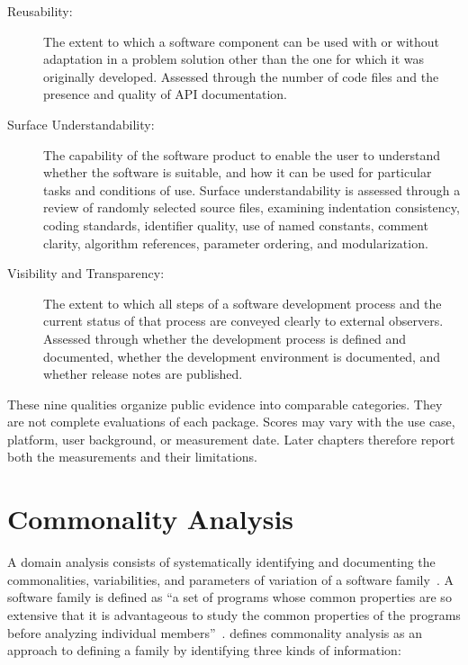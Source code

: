 \begin{description}
    \item[Reusability:] The extent to which a software component can be used with or without adaptation in a problem solution other than the one for which it was originally developed. Assessed through the number of code files and the presence and quality of API documentation.
    \item[Surface Understandability:] The capability of the software product to enable the user to understand whether the software is suitable, and how it can be used for particular tasks and conditions of use. Surface understandability is assessed through a review of randomly selected source files, examining indentation consistency, coding standards, identifier quality, use of named constants, comment clarity, algorithm references, parameter ordering, and modularization.
    \item[Visibility and Transparency:] The extent to which all steps of a software development process and the current status of that process are conveyed clearly to external observers. Assessed through whether the development process is defined and documented, whether the development environment is documented, and whether release notes are published.
\end{description}

These nine qualities organize public evidence into comparable categories. They are not complete evaluations of each package. Scores may vary with the use case, platform, user background, or measurement date. Later chapters therefore report both the measurements and their limitations.

\section{Commonality Analysis}
\label{sec:commonality-analysis-background}

A domain analysis consists of systematically identifying and documenting the commonalities, variabilities, and parameters of variation of a software family~\citep{Weiss1998}. A software family is defined as ``a set of programs whose common properties are so extensive that it is advantageous to study the common properties of the programs before analyzing individual members''~\citep{Parnas1976}. \citet{Weiss1998} defines commonality analysis as an approach to defining a family by identifying three kinds of information:

